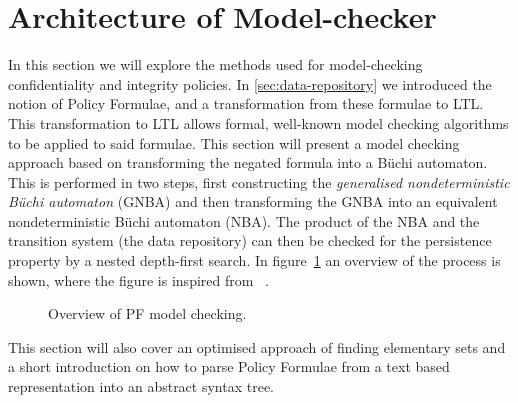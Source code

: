 \section{Architecture of Model-checker}
\label{sec:methods}
In this section we will explore the methods used for model-checking confidentiality and integrity policies. In \ref{sec:data-repository} we introduced the notion of Policy Formulae, and a transformation from these formulae to LTL. This transformation to LTL allows formal, well-known model checking algorithms to be applied to said formulae. This section will present a model checking approach based on transforming the negated formula into a Büchi automaton. This is performed in two steps, first constructing the \emph{generalised nondeterministic Büchi automaton} (GNBA) and then transforming the GNBA into an equivalent nondeterministic Büchi automaton (NBA). The product of the NBA and the transition system (the data repository) can then be checked for the persistence property by a nested depth-first search. In figure~\ref{fig:model-checker} an overview of the process is shown, where the figure is inspired from ~\cite[Fig.~5.16]{baier2008principles}.

\begin{figure}[!ht]
    \centering
    
    \caption{Overview of PF model checking.}
    \label{fig:model-checker}
\end{figure}

This section will also cover an optimised approach of finding elementary sets and a short introduction on how to parse Policy Formulae from a text based representation into an abstract syntax tree.


